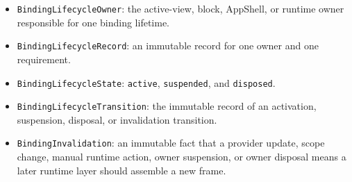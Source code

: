 \begin{itemize}
\tightlist
\item
  \texttt{B\allowbreak{}i\allowbreak{}n\allowbreak{}d\allowbreak{}i\allowbreak{}n\allowbreak{}g\allowbreak{}L\allowbreak{}i\allowbreak{}f\allowbreak{}e\allowbreak{}c\allowbreak{}y\allowbreak{}c\allowbreak{}l\allowbreak{}e\allowbreak{}O\allowbreak{}w\allowbreak{}n\allowbreak{}e\allowbreak{}r}: the active-view, block, AppShell, or runtime owner responsible for one binding lifetime.
\item
  \texttt{B\allowbreak{}i\allowbreak{}n\allowbreak{}d\allowbreak{}i\allowbreak{}n\allowbreak{}g\allowbreak{}L\allowbreak{}i\allowbreak{}f\allowbreak{}e\allowbreak{}c\allowbreak{}y\allowbreak{}c\allowbreak{}l\allowbreak{}e\allowbreak{}R\allowbreak{}e\allowbreak{}c\allowbreak{}o\allowbreak{}r\allowbreak{}d}: an immutable record for one owner and one requirement.
\item
  \texttt{B\allowbreak{}i\allowbreak{}n\allowbreak{}d\allowbreak{}i\allowbreak{}n\allowbreak{}g\allowbreak{}L\allowbreak{}i\allowbreak{}f\allowbreak{}e\allowbreak{}c\allowbreak{}y\allowbreak{}c\allowbreak{}l\allowbreak{}e\allowbreak{}S\allowbreak{}t\allowbreak{}a\allowbreak{}t\allowbreak{}e}: \texttt{a\allowbreak{}c\allowbreak{}t\allowbreak{}i\allowbreak{}v\allowbreak{}e}, \texttt{s\allowbreak{}u\allowbreak{}s\allowbreak{}p\allowbreak{}e\allowbreak{}n\allowbreak{}d\allowbreak{}e\allowbreak{}d}, and \texttt{d\allowbreak{}i\allowbreak{}s\allowbreak{}p\allowbreak{}o\allowbreak{}s\allowbreak{}e\allowbreak{}d}.
\item
  \texttt{B\allowbreak{}i\allowbreak{}n\allowbreak{}d\allowbreak{}i\allowbreak{}n\allowbreak{}g\allowbreak{}L\allowbreak{}i\allowbreak{}f\allowbreak{}e\allowbreak{}c\allowbreak{}y\allowbreak{}c\allowbreak{}l\allowbreak{}e\allowbreak{}T\allowbreak{}r\allowbreak{}a\allowbreak{}n\allowbreak{}s\allowbreak{}i\allowbreak{}t\allowbreak{}i\allowbreak{}o\allowbreak{}n}: the immutable record of an activation, suspension, disposal, or invalidation transition.
\item
  \texttt{B\allowbreak{}i\allowbreak{}n\allowbreak{}d\allowbreak{}i\allowbreak{}n\allowbreak{}g\allowbreak{}I\allowbreak{}n\allowbreak{}v\allowbreak{}a\allowbreak{}l\allowbreak{}i\allowbreak{}d\allowbreak{}a\allowbreak{}t\allowbreak{}i\allowbreak{}o\allowbreak{}n}: an immutable fact that a provider update, scope change, manual runtime action, owner suspension, or owner disposal means a later runtime layer should assemble a new frame.
\end{itemize}

